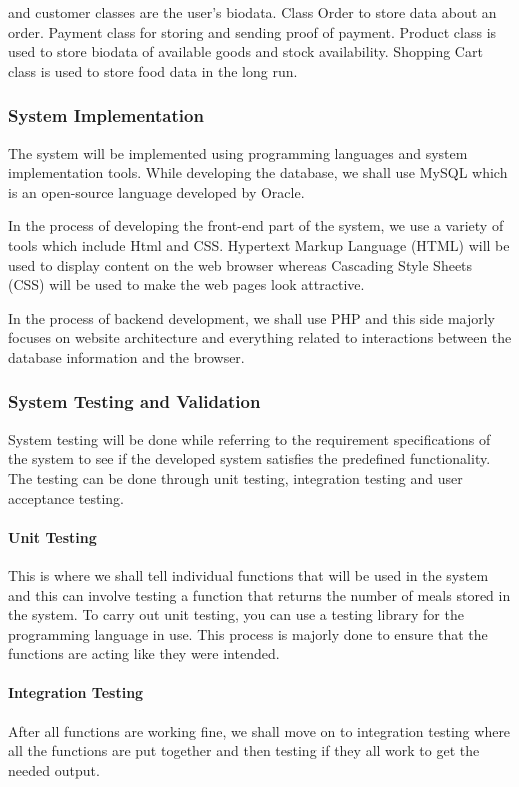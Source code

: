 \documentclass{article}
\begin{document}
and customer classes are the user’s biodata. Class Order to store data about an order. Payment class for storing and sending proof of payment. Product class is used to store biodata of available goods and stock availability. Shopping Cart class is used to store food data in the long run.

\subsubsection{System Implementation}
The system will be implemented using programming languages and system implementation tools. While developing the database, we shall use MySQL which is an open-source language developed by Oracle.  

In the process of developing the front-end part of the system, we use a variety of tools which include Html and CSS.  Hypertext Markup Language (HTML) will be used to display content on the web browser whereas Cascading Style Sheets (CSS) will be used to make the web pages look attractive. 

In the process of backend development, we shall use PHP and this side majorly focuses on website architecture and everything related to interactions between the database information and the browser. 

\subsubsection{System Testing and Validation}
System testing will be done while referring to the requirement specifications of the system to see if the developed system satisfies the predefined functionality. The testing can be done through unit testing, integration testing and user acceptance testing.

\paragraph{Unit Testing \\}
This is where we shall tell individual functions that will be used in the system and this can involve testing a function that returns the number of meals stored in the system. To carry out unit testing, you can use a testing library for the programming language in use. This process is majorly done to ensure that the functions are acting like they were intended. 

\paragraph{Integration Testing \\}
After all functions are working fine, we shall move on to integration testing where all the functions are put together and then testing if they all work to get the needed output.
\end{document}
